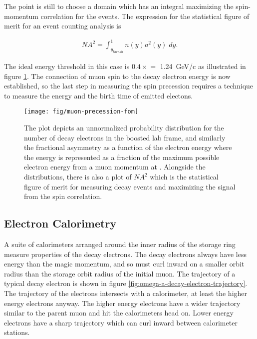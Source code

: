 \noindent
The point is still to choose a domain which has an integral maximizing the spin-momentum correlation for the events.  The expression for the statistical figure of merit for an event counting analysis is

\begin{align}
\label{eqn:expt-figure-of-merit}
NA^2 = \int_{y_{thresh}}^{1} n(y) a^2(y) \;dy.
\end{align}

\noindent
The ideal energy threshold in this case is $0.4\times$\pmagic$ = $ \SI{1.24}{\GeV/c} as illustrated in figure \ref{fig:muon-precession-fom}.  The connection of muon spin to the decay electron energy is now established, so the last step in measuring the spin precession requires a technique to measure the energy and the birth time of emitted electons. \cite{e821-prd}

\begin{figure}
\centering
\texttt{[image: fig/muon-precession-fom]}
\caption{The plot depicts an unnormalized probability distribution for the number of decay electrons in the boosted lab frame, and similarly the fractional asymmetry as a function of the electron energy where the energy is represented as a fraction of the maximum possible electron energy from a muon momentum at \pmagic. Alongside the distributions, there is also a plot of $NA^2$ which is the statistical figure of merit for measuring decay events and maximizing the signal from the spin correlation. \label{fig:muon-precession-fom}}
\end{figure}

\subsection{Electron Calorimetry}

A suite of calorimeters arranged around the inner radius of the storage ring measure properties of the decay electrons.  The decay electrons always have less energy than the magic momentum, and so must curl inward on a smaller orbit radius than the storage orbit radius of the initial muon.  The trajectory of a typical decay electron is shown in figure \ref{fig:omega-a-decay-electron-trajectory}.  The trajectory of the electrons intersects with a calorimeter, at least the higher energy electrons anyway. The higher energy electrons have a wider trajectory similar to the parent muon and hit the calorimeters head on.  Lower energy electrons have a sharp trajectory which can curl inward between calorimeter stations.

